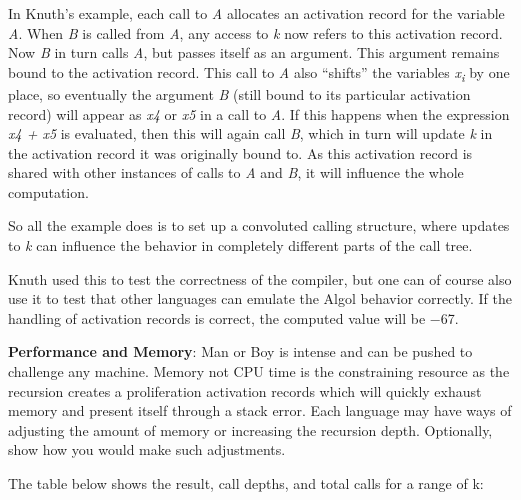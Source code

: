 In Knuth's example, each call to \emph{A} allocates an activation record
for the variable \emph{A}. When \emph{B} is called from \emph{A}, any
access to \emph{k} now refers to this activation record. Now \emph{B} in
turn calls \emph{A}, but passes itself as an argument. This argument
remains bound to the activation record. This call to \emph{A} also
``shifts'' the variables \emph{x\textsubscript{i}} by one place, so
eventually the argument \emph{B} (still bound to its particular
activation record) will appear as \emph{x4} or \emph{x5} in a call to
\emph{A}. If this happens when the expression \emph{x4 + x5} is
evaluated, then this will again call \emph{B}, which in turn will update
\emph{k} in the activation record it was originally bound to. As this
activation record is shared with other instances of calls to \emph{A}
and \emph{B}, it will influence the whole computation.

So all the example does is to set up a convoluted calling structure,
where updates to \emph{k} can influence the behavior in completely
different parts of the call tree.

Knuth used this to test the correctness of the compiler, but one can of
course also use it to test that other languages can emulate the Algol
behavior correctly. If the handling of activation records is correct,
the computed value will be −67.

\textbf{Performance and Memory}: Man or Boy is intense and can be pushed
to challenge any machine. Memory not CPU time is the constraining
resource as the recursion creates a proliferation activation records
which will quickly exhaust memory and present itself through a stack
error. Each language may have ways of adjusting the amount of memory or
increasing the recursion depth. Optionally, show how you would make such
adjustments.

The table below shows the result, call depths, and total calls for a
range of k:

